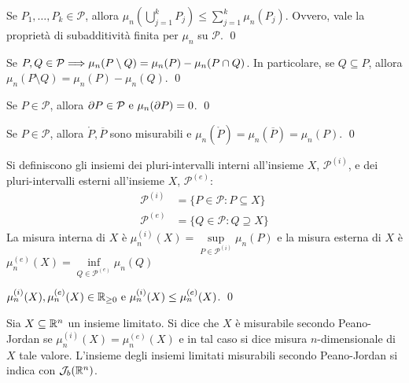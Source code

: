 \begin{corollary}
    Se $P_1,\dots,P_k \in \mathcal{P}$, allora $\displaystyle \mu_n\left(\bigcup_{j=1}^kP_j\right) \leq \sum_{j=1}^k\mu_n(P_j)$. Ovvero, vale la proprietà di subadditività finita per $\mu_n$ su $\mathcal{P}$.
    \qed
\end{corollary}

\begin{corollary}
    Se $P,Q \in \mathcal{P} \Longrightarrow \mu_n(P\setminus Q)=\mu_n(P)-\mu_n(P\cap Q)$. In particolare, se $Q \subseteq P$, allora $\mu_n(P\setminus Q) = \mu_n (P)-\mu_n(Q)$.
    \qed
\end{corollary}

\begin{lemma}
    Se $P \in \mathcal{P}$, allora $\partial P \in \mathcal{P} \text{ e } \mu_n(\partial P)=0$.
    \qed
\end{lemma}

\begin{corollary}
    Se $P \in \mathcal{P}$, allora $\mathring P, \overline{P}$ sono misurabili e $\mu_n(\mathring P)=\mu_n(\overline{P})=\mu_n(P)$.
    \qed
\end{corollary}

\begin{definition}
    Si definiscono gli insiemi dei pluri-intervalli interni all'insieme $X$, $\mathcal{P}^{(i)}$, e dei pluri-intervalli esterni all'insieme $X$, $\mathcal{P}^{(e)}$:
    \begin{align*}
        \mathcal{P}^{(i)}&=\{P\in \mathcal{P}:P\subseteq X\}\\
        \mathcal{P}^{(e)}&=\{Q \in \mathcal{P}: Q \supseteq X \}
    \end{align*}
    La misura interna di $X$ è $
        \mu_n^{(i)}(X)=\sup\limits_{P\in \mathcal{P}^{(i)}}\mu_n(P)
    $
    e la misura esterna di $X$ è $
        \mu_n^{(e)}(X)=\inf\limits_{Q \in \mathcal{P}^{(e)}}\mu_n(Q)
    $
\end{definition}

\begin{lemma}
    $\mu_n^{(i)}(X), \mu_n^{(e)}(X) \in \mathbb{R}_{\geq 0} \text{ e } \mu_n^{(i)}(X)\leq\mu_n^{(e)}(X)$.
    \qed
\end{lemma}

\begin{definition}
    Sia $X \subseteq \mathbb{R}^n$ un insieme limitato. Si dice che $X$ è misurabile secondo Peano-Jordan se $\mu_n^{(i)}(X)=\mu_n^{(e)}(X)$ e in tal caso si dice misura $n$-dimensionale di $X$ tale valore.
    L'insieme degli insiemi limitati misurabili secondo Peano-Jordan si indica con $\mathcal{J}_b(\mathbb{R}^n)$.
\end{definition}

